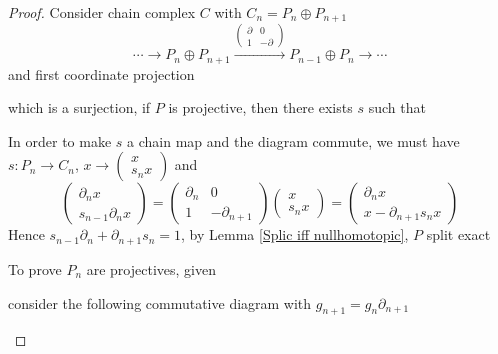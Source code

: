 \documentclass[../main.tex]{subfiles}
\begin{document}
\begin{proof}
Consider chain complex $C$ with $C_n=P_n\oplus P_{n+1}$
\[\cdots\to P_n\oplus P_{n+1}\xrightarrow{\begin{pmatrix}
\partial&0 \\
1&-\partial
\end{pmatrix}}P_{n-1}\oplus P_n\to\cdots\]
and first coordinate projection  which is a surjection, if $P$ is projective, then there exists $s$ such that
\begin{center}
\end{center}
In order to make $s$ a chain map and the diagram commute, we must have $s:P_n\to C_n$, $x\to\begin{pmatrix}
x \\
s_nx
\end{pmatrix}$ and
\[\begin{pmatrix}
\partial_nx \\
s_{n-1}\partial_nx
\end{pmatrix}=\begin{pmatrix}
\partial_n&0 \\
1&-\partial_{n+1}
\end{pmatrix}\begin{pmatrix}
x \\
s_nx
\end{pmatrix}=\begin{pmatrix}
\partial_n x \\
x-\partial_{n+1}s_nx
\end{pmatrix}\]
Hence $s_{n-1}\partial_n+\partial_{n+1}s_n=1$, by Lemma \ref{Splic iff nullhomotopic}, $P$ split exact \par
To prove $P_n$ are projectives, given
\begin{center}
\end{center}
consider the following commutative diagram with $g_{n+1}=g_n\partial_{n+1}$
\begin{center}

\end{center}
\end{proof}
\end{document}
